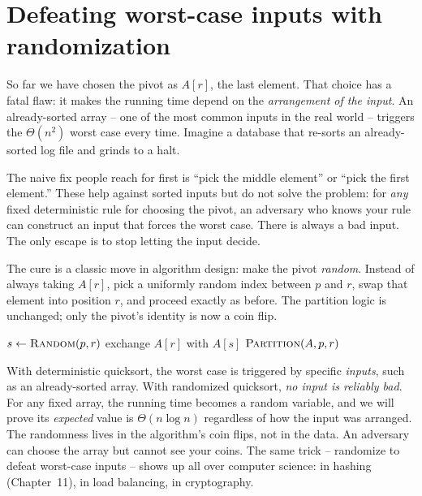\section{Defeating worst-case inputs with randomization}

So far we have chosen the pivot as $A[r]$, the last element. That choice has a
fatal flaw: it makes the running time depend on the \emph{arrangement of the
input}. An already-sorted array -- one of the most common inputs in the real
world -- triggers the $\Theta(n^2)$ worst case every time.
Imagine a database that re-sorts an already-sorted log file and grinds to a halt.

\begin{trapbox}
The naive fix people reach for first is ``pick the middle element'' or ``pick
the first element.'' These help against sorted inputs but do not solve the
problem: for \emph{any} fixed deterministic rule for choosing the pivot, an
adversary who knows your rule can construct an input that forces the worst case.
There is always a bad input. The only escape is to stop letting the input
decide.
\end{trapbox}

The cure is a classic move in algorithm design: make the pivot
\emph{random}. Instead of always taking $A[r]$, pick a uniformly random index
between $p$ and $r$, swap that element into position $r$, and proceed exactly as
before. The partition logic is unchanged; only the pivot's identity is now a
coin flip.

\begin{algorithm}[H]
\caption{\textsc{Randomized-Partition}($A, p, r$)}
$s \leftarrow \textsc{Random}(p, r)$ 
exchange $A[r]$ with $A[s]$ 
\Return $\textsc{Partition}(A, p, r)$\;
\end{algorithm}

\begin{algorithm}[H]
\caption{\textsc{Randomized-Quicksort}($A, p, r$)}
\end{algorithm}

\begin{aestheticbox}
With deterministic
quicksort, the worst case is triggered by specific \emph{inputs}, such as an
already-sorted array. With randomized quicksort, \emph{no input is reliably bad}. For any fixed
array, the running time becomes a random variable, and we will prove
its \emph{expected} value is $\Theta(n \log n)$ regardless of how the input was
arranged. The randomness lives in the algorithm's coin flips, not in the data.
An adversary can choose the array but cannot see your coins. The same trick --
randomize to defeat worst-case inputs -- shows up all over computer science: in
hashing (Chapter~11), in load balancing, in cryptography.
\end{aestheticbox}

